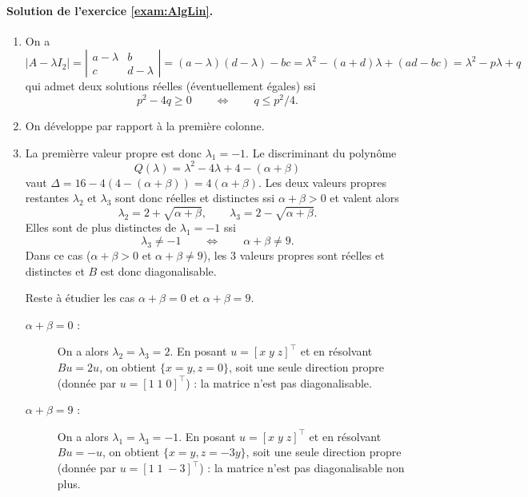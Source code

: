 \paragraph{Solution de l'exercice \ref{exam:AlgLin}.}
  \begin{enumerate}
  \item On a 
  $$
  |A - \lambda I_2| 
  = \left|\begin{array}{cc} a - \lambda & b \\ c & d - \lambda \end{array}\right|
  = (a - \lambda)( d - \lambda) - bc
  = \lambda^2 - (a+d) \lambda + (ad - bc)
  = \lambda^2 - p \lambda + q
  $$
  qui admet deux solutions réelles (éventuellement égales) ssi
  $$
  p^2 - 4 q \geq 0
  \qquad \Leftrightarrow \qquad
  q \leq p^2 / 4.
  $$
  \item On développe par rapport à la première colonne.
  \item La premièrre valeur propre est donc $\lambda_1 = -1$. Le discriminant du polynôme 
  $$
  Q(\lambda) = \lambda^2 - 4 \lambda + 4 - (\alpha+\beta)
  $$
  vaut $\Delta = 16 - 4(4 - (\alpha+\beta)) = 4(\alpha + \beta)$. Les deux valeurs propres restantes $\lambda_2$ et $\lambda_3$ sont donc réelles et distinctes ssi $\alpha + \beta > 0$ et valent alors
  $$
  \lambda_2 = 2 + \sqrt{\alpha + \beta}, 
  \qquad \lambda_3 = 2 - \sqrt{\alpha + \beta}.
  $$
  Elles sont de plus distinctes de $\lambda_1 = -1$ ssi 
  $$
  \lambda_3 \neq -1 \qquad \Leftrightarrow \qquad
  \alpha + \beta \neq 9.
  $$
  Dans ce cas ($\alpha + \beta > 0$ et $\alpha + \beta \neq 9$), les 3 valeurs propres sont réelles et distinctes et $B$ est donc diagonalisable. 
  
  Reste à étudier les cas $\alpha + \beta = 0$ et $\alpha + \beta = 9$.
  \begin{description}
   \item[$\alpha + \beta = 0$ :] On a alors $\lambda_2 = \lambda_3 = 2$. En posant $u = [x \; y \; z]^\top$ et en résolvant $Bu = 2u$, on obtient $\{x=y, z=0\}$, soit une seule direction propre (donnée par $u = [1 \; 1 \; 0]^\top$) : la matrice n'est pas diagonalisable. 
   \item[$\alpha + \beta = 9$ :] On a alors $\lambda_1 = \lambda_3 = -1$. En posant $u = [x \; y \; z]^\top$ et en résolvant $Bu = -u$, on obtient $\{x=y, z=-3y\}$, soit une seule direction propre (donnée par $u = [1 \; 1 \; -3]^\top$) : la matrice n'est pas diagonalisable non plus. 
  \end{description}

  \end{enumerate}

